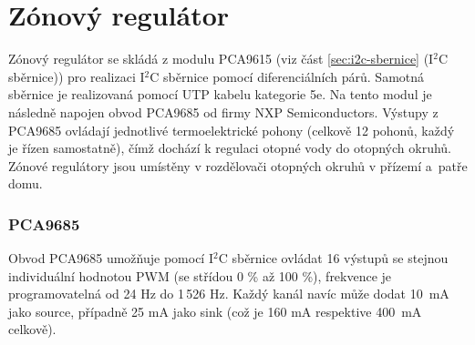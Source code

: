 \section{Zónový regulátor}
Zónový regulátor se skládá z modulu PCA9615 (viz část  \ref{sec:i2c-sbernice} (I$^2$C sběrnice)) pro realizaci I$^2$C sběrnice pomocí diferenciálních párů. Samotná sběrnice je realizovaná pomocí UTP kabelu kategorie 5e. Na tento modul je následně napojen obvod PCA9685 od firmy NXP Semiconductors. Výstupy z PCA9685 ovládají jednotlivé termoelektrické pohony (celkově 12 pohonů, každý je řízen samostatně), čímž dochází k regulaci otopné vody do otopných okruhů. Zónové regulátory jsou umístěny v rozdělovači otopných okruhů v přízemí a~patře domu.

\subsubsection{PCA9685}
Obvod PCA9685 umožňuje pomocí I$^2$C sběrnice ovládat 16 výstupů se stejnou individuální hodnotou PWM (se střídou 0 \% až 100 \%), frekvence je programovatelná od 24 Hz do 1\,526 Hz. Každý kanál navíc může dodat 10~mA jako source, případně 25 mA jako sink (což je 160 mA respektive 400~mA celkově).

